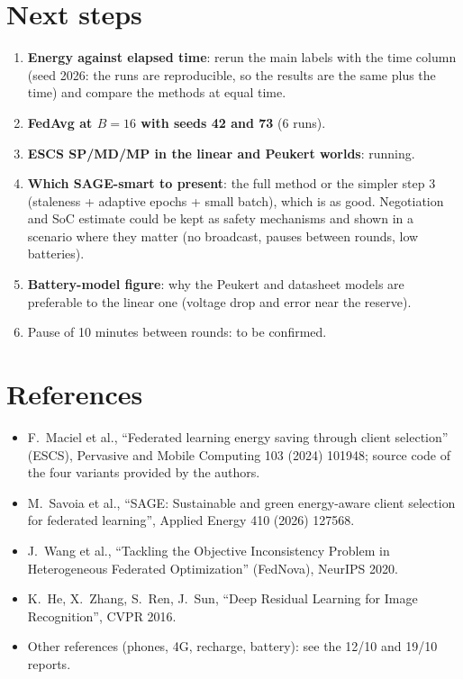 \documentclass[11pt,a4paper]{article}
\begin{document}
\section{Next steps}

\begin{enumerate}
  \item \textbf{Energy against elapsed time}: rerun the main labels with the time
        column (seed 2026: the runs are reproducible, so the results are the same
        plus the time) and compare the methods at equal time.
  \item \textbf{FedAvg at $B=16$ with seeds 42 and 73} (6 runs).
  \item \textbf{ESCS SP/MD/MP in the linear and Peukert worlds}: running.
  \item \textbf{Which SAGE-smart to present}: the full method or the simpler
        step 3 (staleness + adaptive epochs + small batch), which is as good.
        Negotiation and SoC estimate could be kept as safety mechanisms and
        shown in a scenario where they matter (no broadcast, pauses between
        rounds, low batteries).
  \item \textbf{Battery-model figure}: why the Peukert and datasheet models are
        preferable to the linear one (voltage drop and error near the reserve).
  \item Pause of 10 minutes between rounds: to be confirmed.
\end{enumerate}

\section*{References}

\begin{itemize}
  \item F.~Maciel et al., ``Federated learning energy saving through client
        selection'' (ESCS), Pervasive and Mobile Computing 103 (2024) 101948;
        source code of the four variants provided by the authors.
  \item M.~Savoia et al., ``SAGE: Sustainable and green energy-aware client
        selection for federated learning'', Applied Energy 410 (2026) 127568.
  \item J.~Wang et al., ``Tackling the Objective Inconsistency Problem in
        Heterogeneous Federated Optimization'' (FedNova), NeurIPS 2020.
  \item K.~He, X.~Zhang, S.~Ren, J.~Sun, ``Deep Residual Learning for Image
        Recognition'', CVPR 2016.
  \item Other references (phones, 4G, recharge, battery): see the 12/10 and
        19/10 reports.
\end{itemize}
\end{document}
